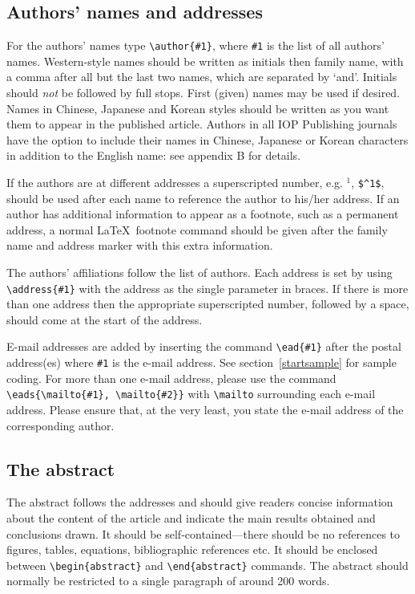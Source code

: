 \documentclass[12pt]{iopart}
\begin{document}
\subsection{Authors' names and addresses}
For the authors' names type \verb"\author{#1}", 
where \verb"#1" is the 
list of all authors' names. Western-style names should be written as initials then
family name, with a comma after all but the last 
two names, which are separated by `and'. Initials should {\it not} be followed by full stops. First (given) names may be used if 
desired.  Names in Chinese, Japanese and Korean styles should be written as you want them to appear in the published article. Authors in all IOP Publishing journals have the option to include their names in Chinese, Japanese or Korean characters in addition to the English name: see appendix B for details. 


If the authors are at different addresses a superscripted number, e.g. $^1$, \verb"$^1$", should be used after each 
name to reference the author to his/her address.
If an author has additional information to appear as a footnote, such as 
a permanent address, a normal \LaTeX\ footnote command
should be given after the family name and address marker 
with this extra information.

The authors' affiliations follow the list of authors. 
Each address is set by using
\verb"\address{#1}" with the address as the single parameter in braces. 
If there is more 
than one address then the appropriate superscripted number, followed by a space, should come at the start of
the address.
 
E-mail addresses are added by inserting the 
command \verb"\ead{#1}" after the postal address(es) where \verb"#1" is the e-mail address.  
See section~\ref{startsample} for sample coding. For more than one e-mail address, please use the command 
\verb"\eads{\mailto{#1}, \mailto{#2}}" with \verb"\mailto" surrounding each e-mail address.  Please ensure
that, at the very least, you state the e-mail address of the corresponding author.

\subsection{The abstract}
The abstract follows the addresses and
should give readers concise information about the content 
of the article and indicate the main results obtained and conclusions 
drawn. It should be self-contained---there should be no references to 
figures, tables, equations, bibliographic references etc.  It should be enclosed between \verb"\begin{abstract}"
and \verb"\end{abstract}" commands.  The abstract should normally be restricted 
to a single paragraph of around 200 words.
\end{document}
